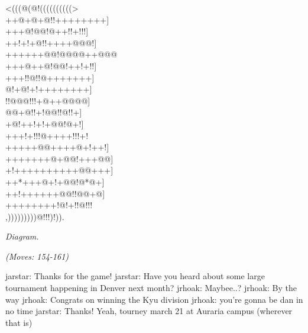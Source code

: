 \documentclass[letterpaper,12pt]{memoir}
\newcounter{GoFigure}[part]
\newcommand{\gofigure}{%
 \stepcounter{GoFigure}
 \centerline{\textit{Diagram.\thinspace\arabic{GoFigure}}}
}
\newcommand{\subtext}[1]{\centerline{\textit{#1}}}
\begin{document}
\begin{minipage}[t]{0.5\textwidth}
{\gnos
<(((@(@!((((((((((>\\
++@+@+@!!++++++++]\\
+++@!@@!@++!!+!!!]\\
++!+!+@!!++++@@@!]\\
++++++@@!@@@@++@@@\\
+++@++@!@@!++!+!!]\\
+++!!@!!@+++++++]\\
@!+@!+!++++++++]\\
!!@@@!!!+@++@@@@]\\
@@+@!!+!@@!!@!!+]\\
+@!++!+!+@@!@+!]\\
+++!+!!!@++++!!!+!\\
+++++@@++++@+!++!]\\
+++++++@+@@!+++@@]\\
+!++++++++++@@+++]\\
++*+++@+!+@@!@*@+]\\
++!++++++@@!!@@+@]\\
++++++++!@!+!!@!!!\\
,)))))))))@!!!)!)).\\
}
\gofigure

\subtext{(Moves: 154-161)}
\end{minipage}
\begin{minipage}[t]{0.5\textwidth}
\setlength{\parskip}{0.5em}
jarstar: Thanks for the game!
jarstar: Have you heard about some large tournament happening in Denver next month?
jrhoak: Maybee..?
jrhoak: By the way
jrhoak: Congrats on winning the Kyu division
jrhoak: you're gonna be dan in no time
jarstar: Thanks!  Yeah, tourney march 21 at Auraria campus (wherever that is)


\end{minipage}
\vfill
\end{document}
